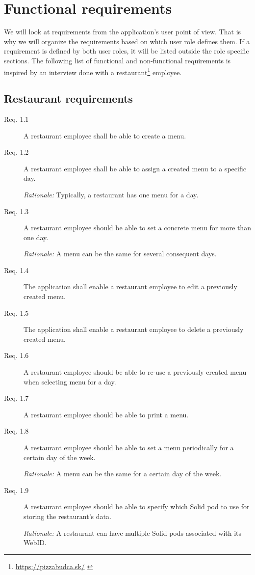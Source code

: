 \section{Functional requirements}
We will look at requirements from the application's user point of view.
That is why we will organize the requirements based on which user role defines them.
If a requirement is defined by both user roles, it will be listed outside the role specific sections.
The following list of functional and non-functional requirements is inspired by an interview done with a restaurant\footnote{\url{https://pizzabudca.sk/}  \label{fnlabel}} employee.

\subsection{Restaurant requirements}
\begin{description}
    \item [Req. 1.1] A restaurant employee shall be able to create a menu.
    \item [Req. 1.2] A restaurant employee shall be able to assign a created menu to a specific day.

    \emph{Rationale:} Typically, a restaurant has one menu for a day.
    \item[Req. 1.3] A restaurant employee should be able to set a concrete menu for more than one day.

    \emph{Rationale:} A menu can be the same for several consequent days.
    \item [Req. 1.4] The application shall enable a restaurant employee to edit a previously created menu.
    \item [Req. 1.5] The application shall enable a restaurant employee to delete a previously created menu.
    \item [Req. 1.6] A restaurant employee should be able to re-use a previously created menu when selecting menu for a day.
    \item [Req. 1.7] A restaurant employee should be able to print a menu.
    \item [Req. 1.8] A restaurant employee should be able to set a menu periodically for a certain day of the week.

    \emph{Rationale:} A menu can be the same for a certain day of the week. 
    \item [Req. 1.9] A restaurant employee should be able to specify which Solid pod to use for storing the restaurant's data.

    \emph{Rationale:} A restaurant can have multiple Solid pods associated with its WebID.
\end{description}

